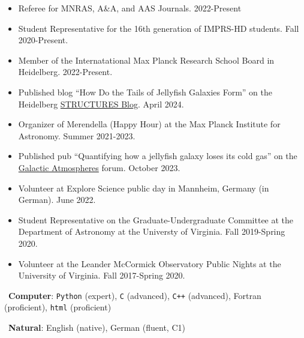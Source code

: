 \documentclass[a4paper,10pt,oneside]{article}
\begin{document}
\begin{itemize}[wide, labelwidth=!, labelindent=-11pt, parsep=0pt]
    \item Referee for MNRAS, A\&A, and AAS Journals. 2022-Present
    \item Student Representative for the 16th generation of IMPRS-HD students. Fall 2020-Present. 
    \item Member of the Internatational Max Planck Research School Board in Heidelberg. 2022-Present.
    \item Published blog ``How Do the Tails of Jellyfish Galaxies Form'' on the Heidelberg \href{https://structures.uni-heidelberg.de/blog/posts/2024_04_jf/index.php}{STRUCTURES Blog}. April 2024.
    \item Organizer of Merendella (Happy Hour) at the Max Planck Institute for Astronomy. Summer 2021-2023.
    \item Published pub ``Quantifying how a jellyfish galaxy loses its cold gas'' on the \href{https://galacticatmospheres.pubpub.org/pub/8t27n1yz/release/1}{Galactic Atmospheres} forum. October 2023.
    \item Volunteer at Explore Science public day in Mannheim, Germany (in German). June 2022.
    \item Student Representative on the Graduate-Undergraduate Committee at the Department of Astronomy at the Universty of Virginia. Fall 2019-Spring 2020.
    \item Volunteer at the Leander McCormick Observatory Public Nights at the University of Virginia. Fall 2017-Spring 2020.
\end{itemize}

\noindent{}

\vspace{5.5pt}

\noindent \hspace{-19pt} \faKeyboardO\ {\bf Computer}: \texttt{Python} (expert), \texttt{C} (advanced), \texttt{C++} (advanced), Fortran (proficient), \texttt{html} (proficient)

\vspace{5.5pt}

\noindent \hspace{-17pt} \faLanguage\ {\bf Natural}: English (native), German (fluent, C1) \\

\begin{comment}
\vspace{11pt} 
{\it Last updated \today.}
\end{comment}
\end{document}
